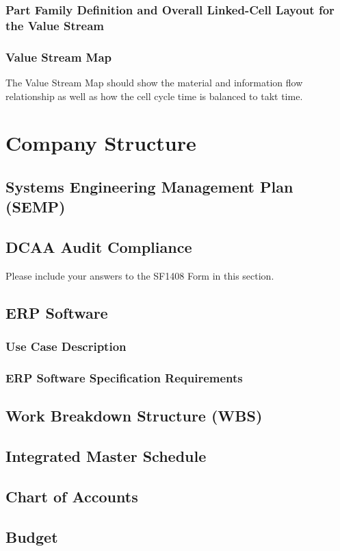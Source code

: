 \documentclass{ipfwpaper}
\begin{document}
    	\subsubsection{Part Family Definition and Overall Linked-Cell Layout for the Value Stream}
    	\subsubsection{Value Stream Map}
    	The Value Stream Map should show the material and information flow relationship as well as how the cell cycle time is balanced to takt time.
\section{Company Structure}
    \subsection{Systems Engineering Management Plan (SEMP)}
    \subsection{DCAA Audit Compliance}
         Please include your answers to the SF1408 Form in this section.
    \subsection{ERP Software}
        \subsubsection{Use Case Description}
        \subsubsection{ERP Software Specification Requirements}
    \subsection{Work Breakdown Structure (WBS)}
    \subsection{Integrated Master Schedule}
    \subsection{Chart of Accounts}
    \subsection{Budget}
    
\end{document}
